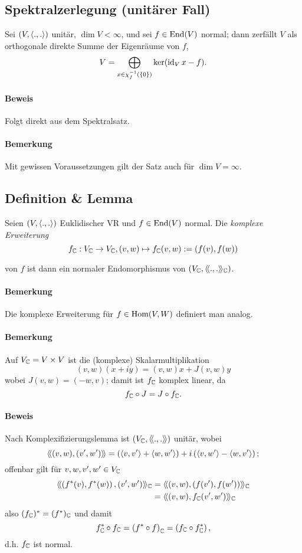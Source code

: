 \subsection{Spektralzerlegung (unitärer Fall)}
\begin{Lemma}[]
	Sei $ (V,\langle .,. \rangle) $ unitär, $ \dim V <\infty $, und sei $ f\in \operatorname{End}(V) $ normal; dann zerfällt $ V $ als orthogonale direkte Summe der Eigenräume von $ f $,
		\[ V = \bigoplus_{x\in \chi_f^{-1}(\{0\})} \ker(\operatorname{id}_Vx-f). \]
\end{Lemma}
\paragraph{Beweis}
	Folgt direkt aus dem Spektralsatz.
\paragraph{Bemerkung}
	Mit gewissen Voraussetzungen gilt der Satz auch für $ \dim V = \infty $.

\subsection{Definition \& Lemma}
\begin{Definition}
	Seien $ (V,\langle .,. \rangle) $ Euklidischer VR und $ f\in \operatorname{End}(V) $ normal. Die \emph{komplexe Erweiterung} 
		\[ f_{\mathbb{C}}:V_{\mathbb{C}} \to V_{\mathbb{C}}, (v,w)\mapsto f_{\mathbb{C}}(v,w) := (f(v),f(w)) \]
\end{Definition}
\begin{Lemma}[]
	von $ f $ ist dann ein normaler Endomorphismus von $ (V_{\mathbb{C}},\langle\! \langle .,. \rangle\! \rangle_{\mathbb{C}}) $.
\end{Lemma}
\paragraph{Bemerkung}
	Die komplexe Erweiterung für $ f\in\operatorname{Hom}(V,W) $ definiert man analog.
\paragraph{Bemerkung}
	Auf $ V_{\mathbb{C}} = V\times V $ ist die (komplexe) Skalarmultiplikation
		\[ (v,w)(x+iy) = (v,w)x+J(v,w)y \]
	wobei $ J(v,w) = (-w,v) $; damit ist $ f_{\mathbb{C}} $ komplex linear, da 
		\[ f_{\mathbb{C}} \circ J = J\circ f_{\mathbb{C}}. \]
\paragraph{Beweis}
	Nach Komplexifizierungslemma ist $ (V_{\mathbb{C}},\langle\! \langle .,. \rangle\! \rangle) $ unitär, wobei
		\[ \langle\! \langle (v,w),(v',w') \rangle\! \rangle = \left(\langle v,v' \rangle+\langle w,w' \rangle\right)+i\left(\langle v,w' \rangle-\langle w,v' \rangle\right); \]
	offenbar gilt für $ v,w,v',w'\in V_{\mathbb{C}} $
		\begin{align*}
		\langle\! \langle \left(f^*(v),f^*(w)\right),(v',w') \rangle\! \rangle_{\mathbb{C}} &= \langle\! \langle (v,w),\left(f(v'),f(w')\right) \rangle\! \rangle_{\mathbb{C}}\\
		&= \langle\! \langle (v,w),f_{\mathbb{C}}(v',w') \rangle\! \rangle_{\mathbb{C}}
		\end{align*}
	also $ (f_{\mathbb{C}})^*=(f^*)_{\mathbb{C}} $ und damit
		\[ f_{\mathbb{C}}^* \circ f_{\mathbb{C}} = \left(f^* \circ f\right)_{\mathbb{C}} = \left(f_{\mathbb{C}} \circ f^*_{\mathbb{C}} \right), \]
	d.h. $ f_{\mathbb{C}} $ ist normal.
